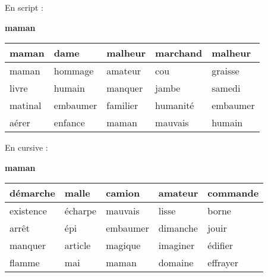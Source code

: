 \documentclass[a4paper, 11pt,oneside, fleqn]{article}
\begin{document}
\begin{onehalfspace}
\large\noindent En script :
\begin{center} {\huge \textbf{maman}}
\vspace{0.25cm}\\
\begin{tabulary}{17cm}{|h|h|h|h|h|}
\hline
maman & dame & malheur & marchand & malheur \\
\hline
maman & hommage & amateur & cou & graisse \\
\hline
livre & humain & manquer & jambe & samedi \\
\hline
matinal & embaumer & familier & humanité & embaumer \\
\hline
aérer & enfance & maman & mauvais & humain \\
\hline
\end{tabulary}
\end{center}
\vspace{0.5cm}

\large\noindent En cursive :
\begin{center}
{\huge \textbf {{\cursive maman}}}
\vspace{0.25cm}\\
\begin{tabulary}{17cm}{|i|i|i|i|i|}
\hline
démarche & malle & camion & amateur & commande \\
\hline
existence & écharpe & mauvais & lisse & borne \\
\hline
arrêt & épi & embaumer & dimanche & jouir \\
\hline
manquer & article & magique & imaginer & édifier \\
\hline
flamme & mai & maman & domaine & effrayer \\
\hline
\end{tabulary}
\end{center}

\end{onehalfspace}
\end{document}
